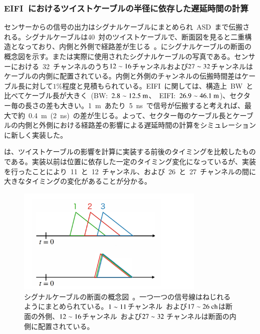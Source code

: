 \subsubsection{EIFI~におけるツイストケーブルの半径に依存した遅延時間の計算}
センサーからの信号の出力はシグナルケーブルにまとめられ~ASD~まで伝搬される。シグナルケーブルは40~対のツイストケーブルで、断面図を見ると二重構造となっており、内側と外側で経路差が生じる~\cite{MT:04}。にシグナルケーブルの断面の概念図を示す。または実際に使用されたシグナルケーブルの写真である。センサーにおける~32~チャンネルのうち$\rm{12\sim16}$チャンネルおよび$\rm{27\sim32}$チャンネルはケーブルの内側に配置されている。内側と外側のチャンネルの伝搬時間差はケーブル長に対して$1\%$程度と見積もられている。EIFI~に関しては、構造上~BW~と比べてケーブル長が大きく~(BW:~$\rm{2.8\sim12.5~m}$、~EIFI:~$\rm{26.9\sim46.1~m}$)、セクター毎の長さの差も大きい。1~m~あたり~5~ns~で信号が伝搬すると考えれば、最大で約~0.4~m~(2~ns)~の差が生じる。よって、セクター毎のケーブル長とケーブルの内側と外側における経路差の影響による遅延時間の計算をシミュレーションに新しく実装した。

は、ツイストケーブルの影響を計算に実装する前後のタイミングを比較したものである。実装以前は位置に依存した一定のタイミング変化になっているが、実装を行ったことにより~11~と~12~チャンネル、および~26~と~27~チャンネルの間に大きなタイミングの変化があることが分かる。

\begin{figure}[tbp]
    \centering   
    \includegraphics[width=0.8\textwidth,page=6]{img/slide/slide.pdf}
    \caption[シグナルケーブルの断面の概念図]{シグナルケーブルの断面の概念図~\cite{MT:04}。一つ一つの信号線はねじれるようにまとめられている。$\rm{1\sim11}$チャンネル~および$\rm{17\sim26~ch}$は断面の外側、$\rm{12\sim16}$チャンネル~および$\rm{27\sim32~}$チャンネルは断面の内側に配置されている。}
    \label{fig:twist0}
\end{figure}

